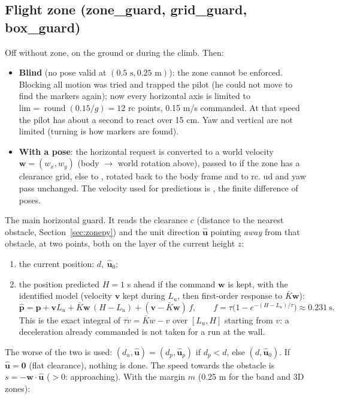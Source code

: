 \subsection{Flight zone (zone\_guard, grid\_guard, box\_guard)}

Off without zone, on the ground or during the climb. Then:
\begin{itemize}[itemsep=1pt]
\item \textbf{Blind} (no pose valid at $(0.5\text{ s}, 0.25\text{ m})$): the zone cannot be enforced. Blocking all
motion was tried and trapped the pilot (he could not move to find the markers again); now every horizontal axis is
limited to $\text{lim}=\operatorname{round}(0.15/g)=12$ rc points, 0.15 m/s commanded. At that speed the pilot has
about a second to react over 15 cm. Yaw and vertical are not limited (turning is how markers are found).
\item \textbf{With a pose}: the horizontal request is converted to a world velocity $\bm w=(w_x,w_y)$ (body $\to$
world rotation above), passed to  if the zone has a clearance grid, else to ,
rotated back to the body frame and to rc. ud and yaw pass unchanged. The velocity used for predictions is
, the finite difference of poses.
\end{itemize}

The main horizontal guard. It reads the clearance $c$ (distance to the nearest obstacle, Section~\ref{sec:zonepy})
and the unit direction $\hat{\bm u}$ pointing \emph{away} from that obstacle, at two points, both on the layer of
the current height $z$:
\begin{enumerate}[itemsep=1pt]
\item the current position: $d,\ \hat{\bm u}_0$;
\item the position predicted $H=1$ s ahead if the command $\bm w$ is kept, with the identified model (velocity
$\bm v$ kept during $L_u$, then first-order response to $\bar K\bm w$):
$$
\hat{\bm p} = \bm p + \bm v L_u + \bar K\bm w\,(H-L_u) + (\bm v-\bar K\bm w)\,f,\qquad
f = \tau\big(1-e^{-(H-L_u)/\tau}\big) \approx 0.231\ \text{s}.
$$
This is the exact integral of $\tau\dot v = \bar K w - v$ over $[L_u, H]$ starting from $v$: a deceleration
already commanded is not taken for a run at the wall.
\end{enumerate}
The worse of the two is used: $(d_u, \hat{\bm u}) = (d_p, \hat{\bm u}_p)$ if $d_p<d$, else $(d,\hat{\bm u}_0)$. If
$\hat{\bm u}=\bm 0$ (flat clearance), nothing is done. The speed towards the obstacle is
$s = -\bm w\cdot\hat{\bm u}$ ($>0$: approaching). With the margin $m$ (0.25 m for the band and 3D zones):

